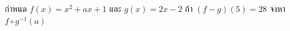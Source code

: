 ﻿%
\question กำหนด $f(x)=x^2+ax+1$ และ $g(x)=2x-2$ ถ้า $(f-g)(5)=28$ จงหา $f\circ g^{-1} (a)$
\newline
{}

